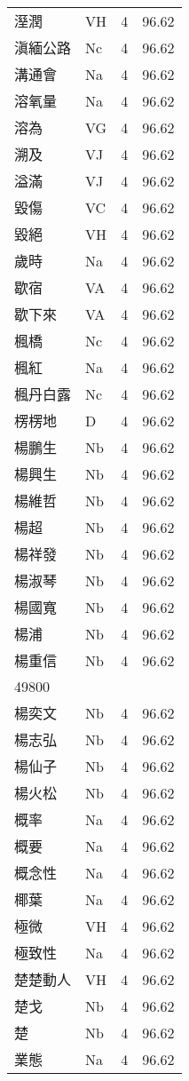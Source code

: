 \documentclass[twocolumn]{book}
\begin{document}
\begin{supertabular}{llrr}
溼潤 & VH & 4 &  96.62\\
滇緬公路 & Nc & 4 &  96.62\\
溝通會 & Na & 4 &  96.62\\
溶氧量 & Na & 4 &  96.62\\
溶為 & VG & 4 &  96.62\\
溯及 & VJ & 4 &  96.62\\
溢滿 & VJ & 4 &  96.62\\
毀傷 & VC & 4 &  96.62\\
毀絕 & VH & 4 &  96.62\\
歲時 & Na & 4 &  96.62\\
歇宿 & VA & 4 &  96.62\\
歇下來 & VA & 4 &  96.62\\
楓橋 & Nc & 4 &  96.62\\
楓紅 & Na & 4 &  96.62\\
楓丹白露 & Nc & 4 &  96.62\\
楞楞地 & D & 4 &  96.62\\
楊鵬生 & Nb & 4 &  96.62\\
楊興生 & Nb & 4 &  96.62\\
楊維哲 & Nb & 4 &  96.62\\
楊超 & Nb & 4 &  96.62\\
楊祥發 & Nb & 4 &  96.62\\
楊淑琴 & Nb & 4 &  96.62\\
楊國寬 & Nb & 4 &  96.62\\
楊浦 & Nb & 4 &  96.62\\
楊重信 & Nb & 4 &  96.62\\
49800\\
楊奕文 & Nb & 4 &  96.62\\
楊志弘 & Nb & 4 &  96.62\\
楊仙子 & Nb & 4 &  96.62\\
楊火松 & Nb & 4 &  96.62\\
概率 & Na & 4 &  96.62\\
概要 & Na & 4 &  96.62\\
概念性 & Na & 4 &  96.62\\
椰葉 & Na & 4 &  96.62\\
極微 & VH & 4 &  96.62\\
極致性 & Na & 4 &  96.62\\
楚楚動人 & VH & 4 &  96.62\\
楚戈 & Nb & 4 &  96.62\\
楚 & Nb & 4 &  96.62\\
業態 & Na & 4 &  96.62\\

\end{supertabular}
\end{document}
